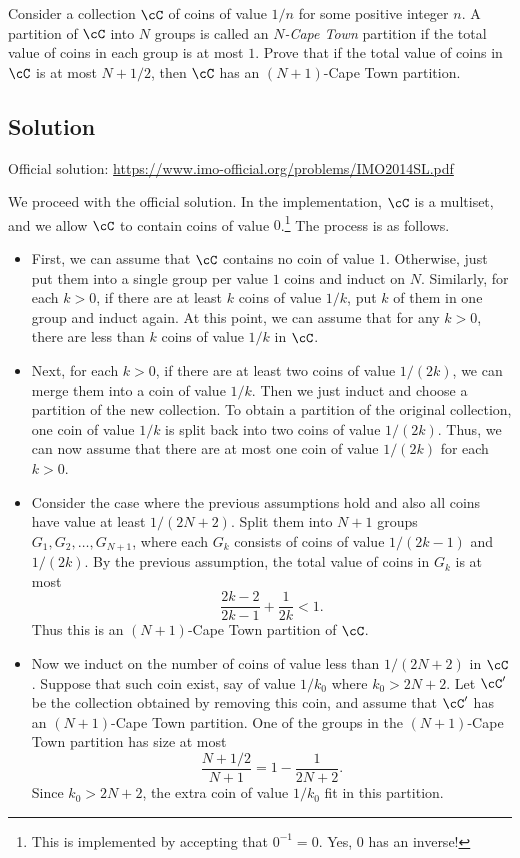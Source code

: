 Consider a collection $\cC$ of coins of value $1/n$ for some positive integer $n$.
A partition of $\cC$ into $N$ groups is called an \emph{$N$-Cape Town} partition if the total value of coins in each group is at most $1$.
Prove that if the total value of coins in $\cC$ is at most $N + 1/2$, then $\cC$ has an $(N + 1)$-Cape Town partition.



\subsection*{Solution}

Official solution: \url{https://www.imo-official.org/problems/IMO2014SL.pdf}

We proceed with the official solution.
In the implementation, $\cC$ is a multiset, and we allow $\cC$ to contain coins of value $0$.\footnote{
    This is implemented by accepting that $0^{-1} = 0$. Yes, $0$ has an inverse!}
The process is as follows.

\begin{itemize}

    \item 
    First, we can assume that $\cC$ contains no coin of value $1$.
    Otherwise, just put them into a single group per value $1$ coins and induct on $N$.
    Similarly, for each $k > 0$, if there are at least $k$ coins of value $1/k$, put $k$ of them in one group and induct again.
    At this point, we can assume that for any $k > 0$, there are less than $k$ coins of value $1/k$ in $\cC$.

    \item
    Next, for each $k > 0$, if there are at least two coins of value $1/(2k)$, we can merge them into a coin of value $1/k$.
    Then we just induct and choose a partition of the new collection.
    To obtain a partition of the original collection, one coin of value $1/k$ is split back into two coins of value $1/(2k)$.
    Thus, we can now assume that there are at most one coin of value $1/(2k)$ for each $k > 0$.

    \item
    Consider the case where the previous assumptions hold and also all coins have value at least $1/(2N + 2)$.
    Split them into $N + 1$ groups $G_1, G_2, \ldots, G_{N + 1}$, where each $G_k$ consists of coins of value $1/(2k - 1)$ and $1/(2k)$.
    By the previous assumption, the total value of coins in $G_k$ is at most
    \[ \frac{2k - 2}{2k - 1} + \frac{1}{2k} < 1. \]
    Thus this is an $(N + 1)$-Cape Town partition of $\cC$.

    \item 
    Now we induct on the number of coins of value less than $1/(2N + 2)$ in $\cC$.
    Suppose that such coin exist, say of value $1/k_0$ where $k_0 > 2N + 2$.
    Let $\cC'$ be the collection obtained by removing this coin, and assume that $\cC'$ has an $(N + 1)$-Cape Town partition.
    One of the groups in the $(N + 1)$-Cape Town partition has size at most
    \[ \frac{N + 1/2}{N + 1} = 1 - \frac{1}{2N + 2}. \]
    Since $k_0 > 2N + 2$, the extra coin of value $1/k_0$ fit in this partition.

\end{itemize}
